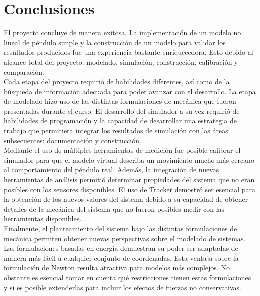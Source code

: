 \section{Conclusiones}
El proyecto concluye de manera exitosa.
La implementación de un modelo no lineal de péndulo simple y la construcción
de un modelo para validar los resultados producidos 
fue una experiencia bastante enriquecedora.
Esto debido al alcance total del proyecto: modelado,
simulación, construcción, calibración y comparación.\\

Cada etapa del proyecto requirió de habilidades diferentes, así como 
de la búsqueda de información adecuada para poder avanzar con el desarrollo.
La etapa de modelado hizo uso de las distintas formulaciones de mecánica 
que fueron presentadas durante el curso.
El desarrollo del simulador a su vez requirió de habilidades de programación
 y la capacidad de desarrollar una estrategia de trabajo que permitiera integrar
 los resultados de simulación con las áreas subsecuentes: documentación y construcción.\\

Mediante el uso de múltiples herramientas de medición fue posible calibrar el 
simulador para que el modelo virtual describa un movimiento mucho 
más cercano al comportamiento del péndulo real.
Además, la integración de nuevas herramientas de análisis permitió determinar 
propiedades del sistema que no eran posibles con los sensores disponibles.
El uso de Tracker demostró ser esencial para la obtención de los nuevos valores
del sistema debido a su capacidad de obtener detalles de la mecánica del sistema
que no fueron posibles medir con las herramientas disponibles.\\

Finalmente, el planteamiento del sistema bajo las distintas formulaciones 
de mecánica permiten obtener nuevas perspectivas sobre el modelado de sistemas.
Las formulaciones basadas en energía demuestran su poder ser adaptadas
de manera más fácil a cualquier conjunto de coordenadas.
Esta ventaja sobre la formulación de Newton resulta atractiva para modelos más complejos.
No obstante es esencial tomar en cuenta qué restricciones tienen estas formulaciones
y si es posible extenderlas para incluir los efectos de fuerzas no conservativas.
